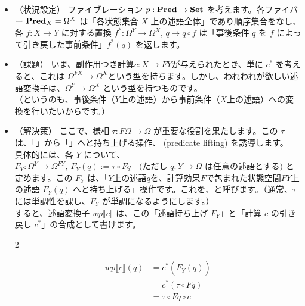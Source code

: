 \documentclass[
		head_space=20mm,
		foot_space=20mm,
		gutter=10mm,
		line_length=190mm
]{jlreq}
\begin{document}
\begin{itemize}
	\item （状況設定） ファイブレーション $p:\mathbf{Pred}\to\mathbf{Set}$ を考えます。各ファイバー $\mathbf{Pred}_X=\Omega^X$ は「各状態集合 $X$ 上の述語全体」であり順序集合をなし、各 $f:X\to Y$ に対する置換 $f^\ast:\Omega^Y\to\Omega^X,\,q\mapsto q\circ f$ は「事後条件 $q$ を $f$ によって引き戻した事前条件」$f^\ast(q)$ を返します。 \vspace{8pt}
	\item （課題） いま、副作用つき計算$c:X\to FY$が与えられたとき、単に $c^\ast$ を考えると、これは $\Omega^{FX}\to\Omega^X$という型を持ちます。しかし、われわれが欲しい述語変換子は、$\Omega^Y\to\Omega^X$ という型を持つものです。\\（というのも、事後条件（$Y$上の述語）から事前条件（$X$上の述語）への変換を行いたいからです。）\vspace{8pt}
	\item （解決策） ここで、様相 $\tau:F\Omega\to\Omega$ が重要な役割を果たします。この $\tau$ は、「」から「」へと持ち上げる操作、 (predicate lifting) を誘導します。\vspace{5pt}\\
	具体的には、各 $Y$ について、\;$\dot F_Y:\Omega^Y\to\Omega^{FY},~ \dot F_Y(q):=\tau\circ Fq\quad \textrm{(ただし $q:Y\to\Omega$ は任意の述語とする)}$ と定めます。この $\dot F_Y$ は、「$Y$上の述語$q$を、計算効果$F$で包まれた状態空間$FY$上の述語 $\dot F_Y(q)$ へと持ち上げる」操作です。これを、と呼びます。（通常、$\tau$ には単調性を課し、$\dot F_Y$ が単調になるようにします。）\vspace{5pt} \\
	すると、述語変換子 $wp\llbracket c\rrbracket$ は、この「述語持ち上げ $\dot F_Y$」と「計算 $c$ の引き戻し $c^\ast$」の合成として書けます。
	\begin{multicols}{2}
		\begin{center}
		\end{center}
		\begin{align*}
			wp\llbracket c\rrbracket(q)&=c^\ast(\dot F_Y(q))\\ &=c^\ast(\tau\circ Fq) \\ &=\tau\circ Fq\circ c
		\end{align*}

\end{multicols}
\end{itemize}
\end{document}
